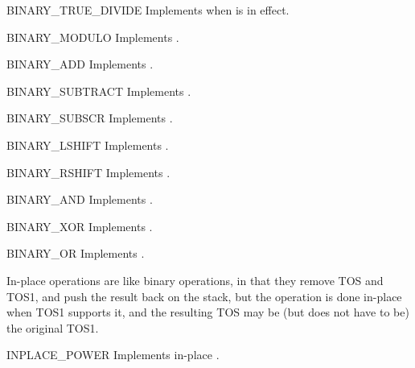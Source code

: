 \begin{opcodedesc}{BINARY_TRUE_DIVIDE}{}
Implements  when
 is in effect.
\end{opcodedesc}

\begin{opcodedesc}{BINARY_MODULO}{}
Implements .
\end{opcodedesc}

\begin{opcodedesc}{BINARY_ADD}{}
Implements .
\end{opcodedesc}

\begin{opcodedesc}{BINARY_SUBTRACT}{}
Implements .
\end{opcodedesc}

\begin{opcodedesc}{BINARY_SUBSCR}{}
Implements .
\end{opcodedesc}

\begin{opcodedesc}{BINARY_LSHIFT}{}
Implements .
\end{opcodedesc}

\begin{opcodedesc}{BINARY_RSHIFT}{}
Implements .
\end{opcodedesc}

\begin{opcodedesc}{BINARY_AND}{}
Implements .
\end{opcodedesc}

\begin{opcodedesc}{BINARY_XOR}{}
Implements .
\end{opcodedesc}

\begin{opcodedesc}{BINARY_OR}{}
Implements .
\end{opcodedesc}

In-place operations are like binary operations, in that they remove TOS and
TOS1, and push the result back on the stack, but the operation is done
in-place when TOS1 supports it, and the resulting TOS may be (but does not
have to be) the original TOS1.

\begin{opcodedesc}{INPLACE_POWER}{}
Implements in-place .
\end{opcodedesc}

